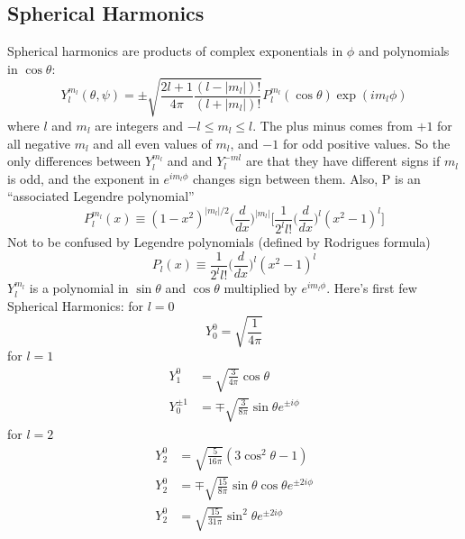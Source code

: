 \documentclass[../../../main.tex]{subfiles}
\begin{document}
\subsection{Spherical Harmonics}
Spherical harmonics are products of complex exponentials in $\phi$ and polynomials in $\cos \theta$:
\begin{equation*}
    Y_l^{m_l}(\theta, \psi)=\pm \sqrt{ \frac{2l + 1}{4\pi} \frac{(l - |m_l|)!}{(l + |m_l|)!}}P_l^{m_l}(\cos\theta) \exp (im_l\phi )
\end{equation*}
where $l$ and $m_l$ are integers and $-l \leq m_l \leq l$. The plus minus comes from $+1$ for all negative $m_l$ and all even values of $m_l$, and $-1$ for odd positive values. So the only differences between $Y^{m_l}_l$ and and $Y^{-ml}_l$ are that they have different signs if $m_l$ is odd, and the exponent in $e^{im_l\phi}$ changes sign between them. Also, P is an “associated Legendre polynomial”
\begin{equation*}
    P_l^{m_l} (x)\equiv (1-x^2)^{|m_l|/2}\biggl(\frac{d}{dx}\biggr)^{|m_l|}\biggl[ \frac{1}{2^ll!}\biggl(\frac{d}{dx}\biggr)^l(x^2-1)^l\biggr]
\end{equation*}
Not to be confused by Legendre polynomials (defined by Rodrigues formula)
\begin{equation*}
    P_l (x)\equiv \frac{1}{2^ll!}\biggl(\frac{d}{dx}\biggr)^l(x^2-1)^l
\end{equation*}
$Y^{m_l}_l$ is a polynomial in $\sin \theta$ and $\cos \theta$ multiplied by $e^{im_l\phi}$. Here's first few Spherical Harmonics: for $l=0$
\begin{equation*}
    Y_0^0=\sqrt{\frac{1}{4\pi}}
\end{equation*}
for $l=1$
\begin{align*}
    Y_1^0&=\sqrt{\frac{3}{4\pi}}\cos\theta \\
    Y_0^{\pm1}&=\mp\sqrt{\frac{3}{8 \pi}}\sin\theta e^{\pm i\phi}
\end{align*}
for $l = 2$
\begin{align*}
    Y_2^0&=\sqrt{\frac{5}{16 \pi}}(3\cos^2\theta-1) \\
    Y_2^0&=\mp\sqrt{\frac{15}{8 \pi}}\sin\theta \cos \theta e^{\pm 2i\phi}\\
    Y_2^0&=\sqrt{\frac{15}{31 \pi}}\sin^2\theta e^{\pm 2i\phi}
\end{align*}
\end{document}
